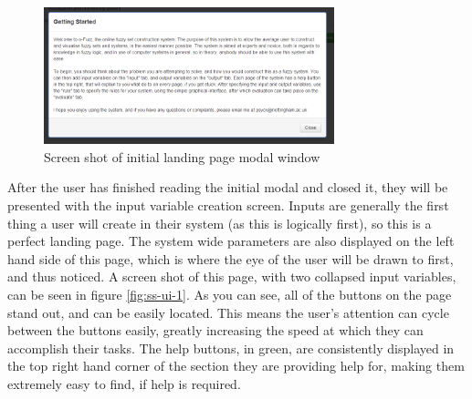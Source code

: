 
\begin{figure}[ht!]
	\centering
	\includegraphics[width=0.75\textwidth]{images/ui-0}
	\vspace{-2mm}
	\caption{Screen shot of initial landing page modal window}
	\label{fig:ss-ui-0}
	\vspace{-1mm}
\end{figure}
\noindent 
After the user has finished reading the initial modal and closed it, they will be presented with the input variable creation screen. Inputs are generally the first thing a user will create in their system (as this is logically first), so this is a perfect landing page. The system wide parameters are also displayed on the left hand side of this page, which is where the eye of the user will be drawn to first, and thus noticed. A screen shot of this page, with two collapsed input variables, can be seen in figure \ref{fig:ss-ui-1}. As you can see, all of the buttons on the page stand out, and can be easily located. This means the user's attention can cycle between the buttons easily, greatly increasing the speed at which they can accomplish their tasks. The help buttons, in green, are consistently displayed in the top right hand corner of the section they are providing help for, making them extremely easy to find, if help is required.

